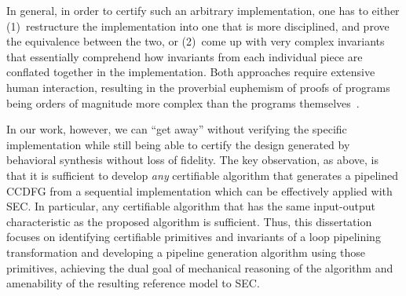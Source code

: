 In general, in order to certify such an arbitrary implementation,
one has to either (1)~restructure the implementation into
one that is more disciplined, and prove the equivalence
between the two, or (2)~come up with very complex
invariants that essentially comprehend how invariants from
each individual piece are conflated together in the
implementation.  Both approaches require extensive human
interaction, resulting in the proverbial euphemism of proofs
of programs being orders of magnitude more complex than the
programs themselves~\cite{liu}.

In our work, however, we can ``get away'' without verifying
the specific implementation while still being able to
certify the design generated by behavioral synthesis without
loss of fidelity. The key observation, as above, is that it
is sufficient to develop {\em any} certifiable algorithm
that generates a pipelined CCDFG from a sequential
implementation which can be effectively applied with SEC.
In particular, any certifiable algorithm that has the same
input-output characteristic as the proposed algorithm
is sufficient.  Thus, this dissertation focuses on identifying
certifiable primitives and invariants of a loop pipelining
transformation and developing a pipeline generation
algorithm using those primitives, achieving the dual goal of
mechanical reasoning of the algorithm and amenability of the
resulting reference model to SEC.

